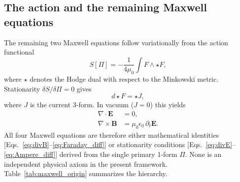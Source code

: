 \documentclass[%
 reprint, amsmath,amssymb, aps, prb, ]{revtex4-2}
\numberwithin{equation}{section}
\newcommand{\hodge}{\star}
\begin{document}
\subsection{The action and the remaining Maxwell equations}

The remaining two Maxwell equations follow variationally from the action functional~\cite{Jackson1998,PeskinSchroeder1995}
\begin{equation}
S[\Pi] = -\frac{1}{4\mu_0}\int F\wedge{\hodge}F,
\label{eq:action}
\end{equation}
where ${\hodge}$ denotes the Hodge dual with respect to the Minkowski metric. Stationarity $\delta S/\delta\Pi = 0$ gives
\begin{equation}
d{\hodge}F = {\hodge}J,
\label{eq:dstar}
\end{equation}
where $J$ is the current 3-form. In vacuum ($J=0$) this yields
\begin{align}
\nabla\cdot\mathbf{E} &= 0, \label{eq:divE}\\
\nabla\times\mathbf{B} &= \mu_0\epsilon_0\,\partial_t\mathbf{E}. \label{eq:Ampere_diff}
\end{align}
All four Maxwell equations are therefore either mathematical identities [Eqs.~\eqref{eq:divB}--\eqref{eq:Faraday_diff}] or stationarity conditions [Eqs.~\eqref{eq:divE}--\eqref{eq:Ampere_diff}] derived from the single primary 1-form $\Pi$. None is an independent physical axiom in the present framework. Table~\ref{tab:maxwell_origin} summarizes the hierarchy.
\end{document}
